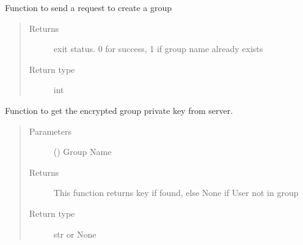 \documentclass[letterpaper,10pt,english]{sphinxmanual}
\begin{document}
\begin{fulllineitems}
\begin{fulllineitems}
\end{fulllineitems}


\begin{fulllineitems}
\label{\detokenize{Message:Message.Message._create_grp}}
Function to send a request to create a group
\begin{quote}\begin{description}
\item[{Returns}] \leavevmode
exit status. 0 for success, 1 if group name already exists

\item[{Return type}] \leavevmode
int

\end{description}\end{quote}

\end{fulllineitems}


\begin{fulllineitems}
\label{\detokenize{Message:Message.Message._get_group_key}}
Function to get the encrypted group private key from server.
\begin{quote}\begin{description}
\item[{Parameters}] \leavevmode
{} () \textendash{} Group Name

\item[{Returns}] \leavevmode
This function returns key if found, else None if User not in group

\item[{Return type}] \leavevmode
str or None

\end{description}\end{quote}

\end{fulllineitems}



\end{fulllineitems}
\end{document}
